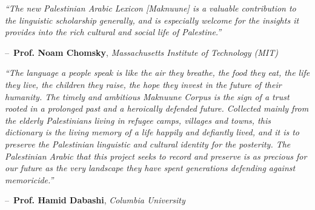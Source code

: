 \documentclass[11pt]{book}
\makeatletter
\newenvironment{chapquote}[2][2em]
  {\setlength{\@tempdima}{#1}%
   \def\chapquote@author{#2}%
   \parshape 1 \@tempdima \dimexpr\textwidth-2\@tempdima\relax%
   \itshape}
  {\par\normalfont\hfill--\ \chapquote@author\hspace*{\@tempdima}\par\bigskip}
\makeatother
\begin{document}
\begin{chapquote}{\textbf{Prof. Noam Chomsky}, \textit{Massachusetts Institute of Technology (MIT)}}
``The new Palestinian Arabic Lexicon [Maknuune] is a valuable contribution to the linguistic scholarship generally, and is especially welcome for the insights it provides into the rich cultural and social life of Palestine.''
\end{chapquote}

\vspace{5mm}

\begin{chapquote}{\textbf{Prof. Hamid Dabashi}, \textit{Columbia University}}
``The language a people speak is like the air they breathe, the food they eat, the life they live, the children they raise, the hope they invest in the future of their humanity. The timely and ambitious Maknuune Corpus is the sign of a trust rooted in a prolonged past and a heroically defended future. Collected mainly from the elderly Palestinians living in refugee camps, villages and towns, this dictionary is the living memory of a life happily and defiantly lived, and it is to preserve the Palestinian linguistic and cultural identity for the posterity. The Palestinian Arabic that this project seeks to record and preserve is as precious for our future as the very landscape they have spent generations defending against memoricide.''
\end{chapquote}

\vspace{5mm}
\end{document}
